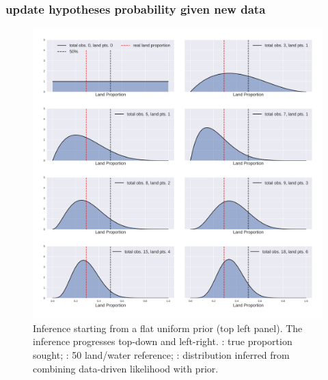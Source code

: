 \documentclass[10pt]{article}
\begin{document}
		\subsubsection{update hypotheses probability given new data}
			\begin{figure}[H]
				\centering
				\includegraphics[scale=0.35]{landProp_flat.png}
				\caption{Inference starting from a flat uniform prior (top left panel). The inference progresses top-down and left-right.
				\protect\reddash: true proportion sought;
				\protect\blkdash: 50 land/water reference;
				\protect\blksold: distribution inferred from combining data-driven likelihood with prior.}
			\end{figure}%
\end{document}
